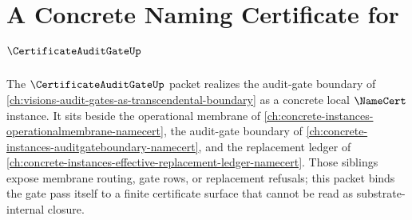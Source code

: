 \chapter{A Concrete Naming Certificate for $\CertificateAuditGateUp$}
\label{ch:concrete-instances-certificateauditgate-namecert}

The $\CertificateAuditGateUp$ packet realizes the audit-gate boundary of \autoref{ch:visions-audit-gates-as-transcendental-boundary} as a concrete local $\NameCert$ instance. It sits beside the operational membrane of \autoref{ch:concrete-instances-operationalmembrane-namecert}, the audit-gate boundary of \autoref{ch:concrete-instances-auditgateboundary-namecert}, and the replacement ledger of \autoref{ch:concrete-instances-effective-replacement-ledger-namecert}. Those siblings expose membrane routing, gate rows, or replacement refusals; this packet binds the gate pass itself to a finite certificate surface that cannot be read as substrate-internal closure.



